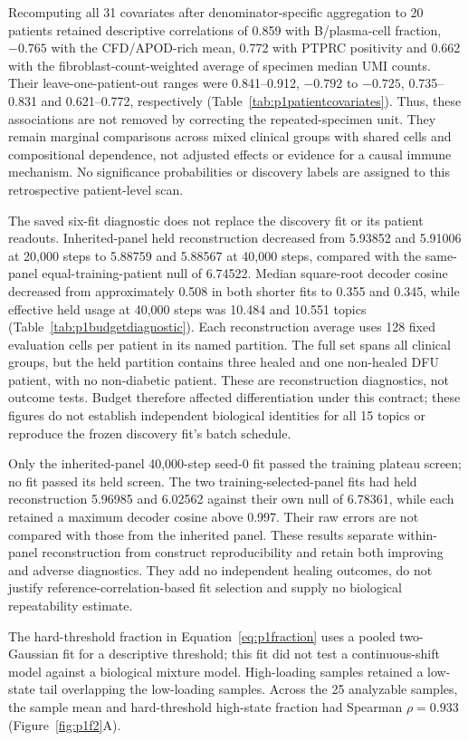 \documentclass[10pt,a4paper]{article}
\begin{document}
Recomputing all 31 covariates after denominator-specific aggregation to 20 patients retained descriptive correlations of 0.859 with B/plasma-cell fraction, $-0.765$ with the CFD/APOD-rich mean, 0.772 with PTPRC positivity and 0.662 with the fibroblast-count-weighted average of specimen median UMI counts. Their leave-one-patient-out ranges were 0.841--0.912, $-0.792$ to $-0.725$, 0.735--0.831 and 0.621--0.772, respectively (Table~\ref{tab:p1patientcovariates}). Thus, these associations are not removed by correcting the repeated-specimen unit. They remain marginal comparisons across mixed clinical groups with shared cells and compositional dependence, not adjusted effects or evidence for a causal immune mechanism. No significance probabilities or discovery labels are assigned to this retrospective patient-level scan.

The saved six-fit diagnostic does not replace the discovery fit or its patient readouts. Inherited-panel held reconstruction decreased from 5.93852 and 5.91006 at 20,000 steps to 5.88759 and 5.88567 at 40,000 steps, compared with the same-panel equal-training-patient null of 6.74522. Median square-root decoder cosine decreased from approximately 0.508 in both shorter fits to 0.355 and 0.345, while effective held usage at 40,000 steps was 10.484 and 10.551 topics (Table~\ref{tab:p1budgetdiagnostic}). Each reconstruction average uses 128 fixed evaluation cells per patient in its named partition. The full set spans all clinical groups, but the held partition contains three healed and one non-healed DFU patient, with no non-diabetic patient. These are reconstruction diagnostics, not outcome tests. Budget therefore affected differentiation under this contract; these figures do not establish independent biological identities for all 15 topics or reproduce the frozen discovery fit's batch schedule.

Only the inherited-panel 40,000-step seed-0 fit passed the training plateau screen; no fit passed its held screen. The two training-selected-panel fits had held reconstruction 5.96985 and 6.02562 against their own null of 6.78361, while each retained a maximum decoder cosine above 0.997. Their raw errors are not compared with those from the inherited panel. These results separate within-panel reconstruction from construct reproducibility and retain both improving and adverse diagnostics. They add no independent healing outcomes, do not justify reference-correlation-based fit selection and supply no biological repeatability estimate.

\FloatBarrier
The hard-threshold fraction in Equation~\eqref{eq:p1fraction} uses a pooled two-Gaussian fit for a descriptive threshold; this fit did not test a continuous-shift model against a biological mixture model. High-loading samples retained a low-state tail overlapping the low-loading samples. Across the 25 analyzable samples, the sample mean and hard-threshold high-state fraction had Spearman $\rho=0.933$ (Figure~\ref{fig:p1f2}A\label{call:p1f2}).
\end{document}
